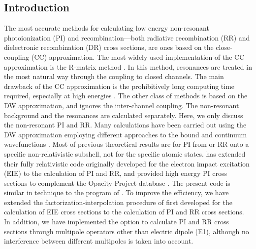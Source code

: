 \subsection{Introduction}
The most accurate methods for calculating low energy
non-resonant photoionization (PI) and
recombination---both radiative recombination (RR) and dielectronic
recombination (DR) cross sections, are ones
based on the close-coupling (CC) approximation. The most widely used
implementation of the CC approximation is the 
R-matrix method \cite{hummer93, berrington95}. In this method, resonances are
treated in the most natural way through the coupling to closed channels. The
main drawback of the CC approximation is the prohibitively long computing time
required, especially at high energies \cite{zhang98}. The other class of
methods is based on the DW approximation, and ignores the inter-channel
coupling. The non-resonant background and the resonances are calculated
separately. Here, we only discuss the non-resonant
PI and RR. Many calculations have been carried out using the DW approximation
employing different approaches to the bound and continuum wavefunctions
\cite{reilman79, clark86, verner93}. Most of previous theoretical results are
for PI from or RR onto a specific non-relativistic subshell, not for the
specific atomic states. \citet{zhang98} has extended their fully
relativistic code originally developed for the electron impact excitation
(EIE) to the 
calculation of PI and RR, and provided high energy PI cross sections to
complement the Opacity Project database \cite{seaton87}. The
present code is similar in technique to the program of \citet{zhang98}. To
improve the efficiency, we have extended the factorization-interpolation
procedure of \citet{barshalom:1988a} first developed for the calculation of EIE
cross sections to the calculation of PI and RR cross sections. 
In addition, we have implemented the option to calculate PI and RR cross
sections through multipole operators other than electric dipole (E1), although
no interference between different multipoles is taken into account. 

